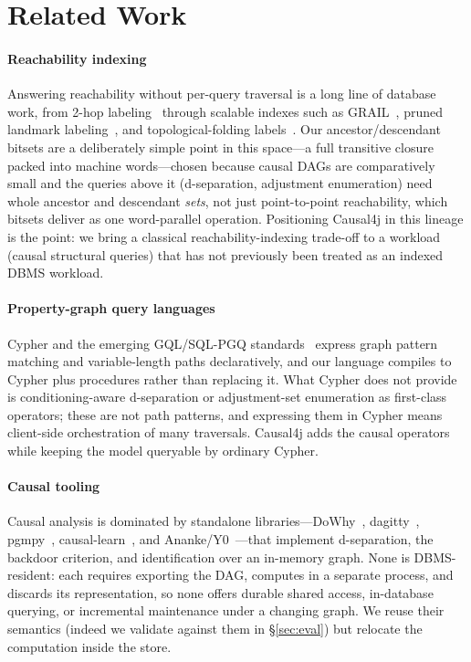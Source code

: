 \section{Related Work}\label{sec:related}

\paragraph{Reachability indexing}
Answering reachability without per-query traversal is a long line of database
work, from 2-hop labeling~\cite{TODO_2hop} through scalable indexes such as
GRAIL~\cite{TODO_grail}, pruned landmark labeling~\cite{TODO_pll}, and
topological-folding labels~\cite{TODO_tflabel}. Our ancestor/descendant bitsets
are a deliberately simple point in this space---a full transitive closure packed
into machine words---chosen because causal DAGs are comparatively small and the
queries above it (d-separation, adjustment enumeration) need whole ancestor and
descendant \emph{sets}, not just point-to-point reachability, which bitsets
deliver as one word-parallel operation. Positioning Causal4j in this lineage is
the point: we bring a classical reachability-indexing trade-off to a workload
(causal structural queries) that has not previously been treated as an indexed
DBMS workload.

\paragraph{Property-graph query languages}
Cypher and the emerging GQL/SQL-PGQ standards~\cite{TODO_gql} express graph
pattern matching and variable-length paths declaratively, and our language
compiles to Cypher plus procedures rather than replacing it. What Cypher does not
provide is conditioning-aware d-separation or adjustment-set enumeration as
first-class operators; these are not path patterns, and expressing them in Cypher
means client-side orchestration of many traversals. Causal4j adds the causal
operators while keeping the model queryable by ordinary Cypher.

\paragraph{Causal tooling}
Causal analysis is dominated by standalone libraries---DoWhy~\cite{TODO_dowhy},
dagitty~\cite{TODO_dagitty}, pgmpy~\cite{TODO_pgmpy},
causal-learn~\cite{TODO_causallearn}, and Ananke/Y0~\cite{TODO_ananke}---that
implement d-separation, the backdoor criterion, and identification over an
in-memory graph. None is DBMS-resident: each requires exporting the DAG, computes
in a separate process, and discards its representation, so none offers durable
shared access, in-database querying, or incremental maintenance under a changing
graph. We reuse their semantics (indeed we validate against them in
\S\ref{sec:eval}) but relocate the computation inside the store.


